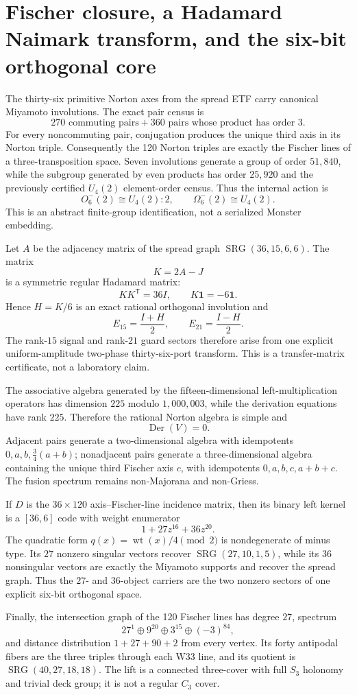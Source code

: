 \section{Fischer closure, a Hadamard Naimark transform, and the six-bit orthogonal core}
\label{sec:bt3722-bt3728-fischer-hadamard}

The thirty-six primitive Norton axes from the spread ETF carry canonical Miyamoto involutions. The exact pair census is
\[
270\text{ commuting pairs}+360\text{ pairs whose product has order }3.
\]
For every noncommuting pair, conjugation produces the unique third axis in its Norton triple. Consequently the 120 Norton triples are exactly the Fischer lines of a three-transposition space. Seven involutions generate a group of order $51{,}840$, while the subgroup generated by even products has order $25{,}920$ and the previously certified $U_4(2)$ element-order census. Thus the internal action is
\[
O_6^-(2)\cong U_4(2){:}2,
\qquad
\Omega_6^-(2)\cong U_4(2).
\]
This is an abstract finite-group identification, not a serialized Monster embedding.

Let $A$ be the adjacency matrix of the spread graph $\operatorname{SRG}(36,15,6,6)$. The matrix
\[
K=2A-J
\]
is a symmetric regular Hadamard matrix:
\[
K K^{\mathsf T}=36I,
\qquad
K\mathbf1=-6\mathbf1.
\]
Hence $H=K/6$ is an exact rational orthogonal involution and
\[
E_{15}=\frac{I+H}{2},
\qquad
E_{21}=\frac{I-H}{2}.
\]
The rank-$15$ signal and rank-$21$ guard sectors therefore arise from one explicit uniform-amplitude two-phase thirty-six-port transform. This is a transfer-matrix certificate, not a laboratory claim.

The associative algebra generated by the fifteen-dimensional left-multiplication operators has dimension $225$ modulo $1{,}000{,}003$, while the derivation equations have rank $225$. Therefore the rational Norton algebra is simple and
\[
\operatorname{Der}(V)=0.
\]
Adjacent pairs generate a two-dimensional algebra with idempotents $0,a,b,\tfrac34(a+b)$; nonadjacent pairs generate a three-dimensional algebra containing the unique third Fischer axis $c$, with idempotents $0,a,b,c,a+b+c$. The fusion spectrum remains non-Majorana and non-Griess.

If $D$ is the $36\times120$ axis--Fischer-line incidence matrix, then its binary left kernel is a $[36,6]$ code with weight enumerator
\[
1+27z^{16}+36z^{20}.
\]
The quadratic form $q(x)=\operatorname{wt}(x)/4\pmod2$ is nondegenerate of minus type. Its $27$ nonzero singular vectors recover $\operatorname{SRG}(27,10,1,5)$, while its $36$ nonsingular vectors are exactly the Miyamoto supports and recover the spread graph. Thus the $27$- and $36$-object carriers are the two nonzero sectors of one explicit six-bit orthogonal space.

Finally, the intersection graph of the 120 Fischer lines has degree $27$, spectrum
\[
27^1\oplus9^{20}\oplus3^{15}\oplus(-3)^{84},
\]
and distance distribution $1+27+90+2$ from every vertex. Its forty antipodal fibers are the three triples through each W33 line, and its quotient is $\operatorname{SRG}(40,27,18,18)$. The lift is a connected three-cover with full $S_3$ holonomy and trivial deck group; it is not a regular $C_3$ cover.
